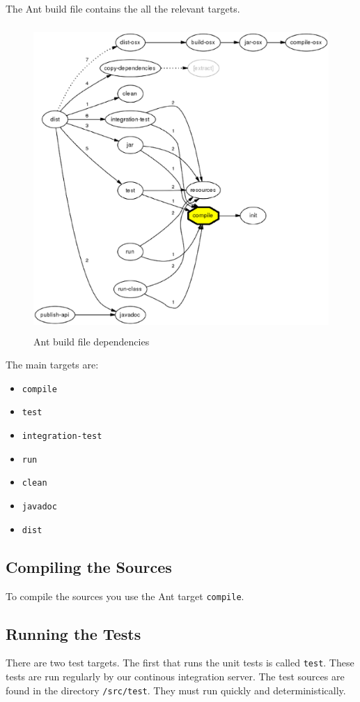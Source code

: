 \documentclass[11pt,a4paper]{article}
\begin{document}
The Ant build file contains the all the relevant targets.
\begin{figure}[H]
 \centering
 \includegraphics[width=15cm,height=11.6cm]{../images/developersguide/ant-graph.eps}
 \caption{Ant build file dependencies}
\end{figure}

The main targets are:
\begin{itemize}
 \item \texttt{compile}
 \item \texttt{test}
 \item \texttt{integration-test}
 \item \texttt{run}
 \item \texttt{clean}
 \item \texttt{javadoc}
 \item \texttt{dist}
\end{itemize}

\subsection{Compiling the Sources}
To compile the sources you use the Ant target \texttt{compile}. 

\subsection{Running the Tests}
There are two test targets. The first that runs the unit tests is called
\texttt{test}. These tests are run regularly by our continous integration
server. The test sources are found in the directory \texttt{/src/test}. They
must run quickly and deterministically.
\end{document}
